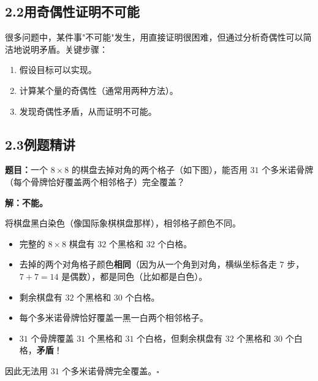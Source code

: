 \documentclass[12pt, a4paper]{ctexart}
\begin{document}
\subsection*{2.2\quad 用奇偶性证明不可能}

\begin{tipbox}[奇偶分析的核心思想]
很多问题中，某件事"不可能"发生，用直接证明很困难，但通过分析奇偶性可以简洁地说明矛盾。关键步骤：
\begin{enumerate}[itemsep=1pt]
  \item 假设目标可以实现。
  \item 计算某个量的奇偶性（通常用两种方法）。
  \item 发现奇偶性矛盾，从而证明不可能。
\end{enumerate}
\end{tipbox}

\subsection*{2.3\quad 例题精讲}

\begin{examplebox}
\textbf{题目：}一个 $8\times 8$ 的棋盘去掉对角的两个格子（如下图），能否用 $31$ 个多米诺骨牌（每个骨牌恰好覆盖两个相邻格子）完全覆盖？

\begin{center}
\end{center}
\end{examplebox}

\textbf{解：}\;\textbf{不能。}

将棋盘黑白染色（像国际象棋棋盘那样），相邻格子颜色不同。
\begin{itemize}[itemsep=2pt]
  \item 完整的 $8\times 8$ 棋盘有 $32$ 个黑格和 $32$ 个白格。
  \item 去掉的两个对角格子颜色\textbf{相同}（因为从一个角到对角，横纵坐标各走 $7$ 步，$7+7=14$ 是偶数），都是同色（比如都是白色）。
  \item 剩余棋盘有 $32$ 个黑格和 $30$ 个白格。
  \item 每个多米诺骨牌恰好覆盖一黑一白两个相邻格子。
  \item $31$ 个骨牌覆盖 $31$ 个黑格和 $31$ 个白格，但剩余棋盘有 $32$ 个黑格和 $30$ 个白格，\textbf{矛盾}！
\end{itemize}
因此无法用 $31$ 个多米诺骨牌完全覆盖。\hfill$\square$
\end{document}
